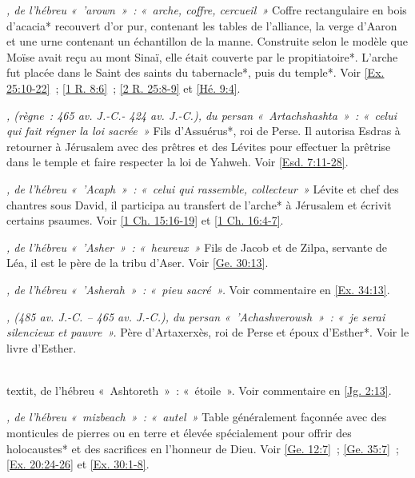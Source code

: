 \begin{multicols}{2}
\textit{, de l'hébreu «~'arown~»~: «~arche, coffre, cercueil~»}\newline
Coffre rectangulaire en bois d'acacia* recouvert d'or pur, contenant les tables de l'alliance, la verge d'Aaron et une urne contenant un échantillon de la manne. Construite selon le modèle que Moïse avait reçu au mont Sinaï, elle était couverte par le propitiatoire*. L'arche fut placée dans le Saint des saints du tabernacle*, puis du temple*. Voir \vref{Ex. 25:10-22}~; \vref{1 R. 8:6}~; \vref{2 R. 25:8-9} et \vref{Hé. 9:4}.

\textit{, (règne~: 465 av. J.-C.- 424 av. J.-C.), du persan «~Artachshashta~»~: «~celui qui fait régner la loi sacrée~»}\newline
Fils d'Assuérus*, roi de Perse. Il autorisa Esdras à retourner à Jérusalem avec des prêtres et des Lévites pour effectuer la prêtrise dans le temple et faire respecter la loi de Yahweh. Voir \vref{Esd. 7:11-28}.

\textit{, de l'hébreu «~'Acaph~»~: «~celui qui rassemble, collecteur~»}\newline
Lévite et chef des chantres sous David, il participa au transfert de l'arche* à Jérusalem et écrivit certains psaumes. Voir \vref{1 Ch. 15:16-19} et \vref{1 Ch. 16:4-7}.

\textit{, de l'hébreu «~'Asher~»~: «~heureux~»}\newline
Fils de Jacob et de Zilpa, servante de Léa, il est le père de la tribu d'Aser. Voir \vref{Ge. 30:13}.

\textit{, de l'hébreu «~'Asherah~»~: «~pieu sacré~».}\newline
Voir commentaire en \vref{Ex. 34:13}.

\textit{, (485 av. J.-C. – 465 av. J.-C.), du persan «~'Achashverowsh~»~: «~je serai silencieux et pauvre~».}\newline
Père d'Artaxerxès, roi de Perse et époux d'Esther*. Voir le livre d'Esther.

\\textit{, de l'hébreu «~Ashtoreth~»~: «~étoile~».}\newline
Voir commentaire en \vref{Jg. 2:13}.

\textit{, de l'hébreu «~mizbeach~»~: «~autel~»}\newline
Table généralement façonnée avec des monticules de pierres ou en terre et élevée spécialement pour offrir des holocaustes* et des sacrifices en l'honneur de Dieu. Voir \vref{Ge. 12:7}~; \vref{Ge. 35:7}~; \vref{Ex. 20:24-26} et \vref{Ex. 30:1-8}.


\end{multicols}
